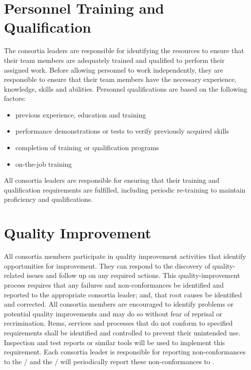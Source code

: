 \section{Personnel Training and Qualification}

The  consortia leaders are responsible for identifying the
resources to ensure that their team members are adequately trained and
qualified to perform their assigned work. Before allowing personnel to
work independently, they are responsible to ensure that their team
members have the necessary experience, knowledge, skills and
abilities. Personnel qualifications are based on the following
factors:
\begin{itemize}
 \item previous experience, education and training
 \item performance demonstrations or tests to verify previously acquired skills
 \item completion of training or qualification programs
 \item on-the-job training
\end{itemize}

All  consortia leaders are responsible for ensuring that their
training and qualification requirements are fulfilled, including
periodic re-training to maintain proficiency and qualifications.


\section{Quality Improvement}

All  consortia members participate in quality improvement
activities that identify opportunities for improvement. They can
respond to the discovery of quality-related issues and follow up on
any required actions. This quality-improvement process requires that
any failures and non-conformances be identified and reported to the
appropriate consortia leader; and, that root causes be identified and
corrected. All consortia members are encouraged to identify problems
or potential quality improvements and may do so without fear of
reprisal or recrimination. Items, services and processes that do not
conform to specified requirements shall be identified and controlled
to prevent their unintended use. Inspection and test reports or
similar tools will be used to implement this requirement. Each
consortia leader is responsible for reporting non-conformances to the
/  and the /
 will periodically report these non-conformances to
 .

